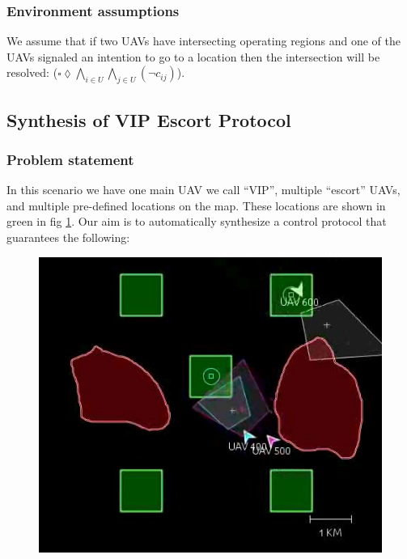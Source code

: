 \documentclass[]{article}
\begin{document}
\subsubsection{Environment assumptions}\label{environment-assumptions}


We assume that if two UAVs have intersecting operating regions and one
of the UAVs signaled an intention to go to a location then the
intersection will be resolved: ($\square  \lozenge \bigwedge\limits_{i \in U}\bigwedge\limits_{j \in U} ( \lnot c_{ij})$).


\subsection{Synthesis of VIP Escort Protocol}\label{vip-escort}

\subsubsection{Problem statement}\label{problem-statement}

In this scenario we have one main UAV we call ``VIP'', multiple
``escort'' UAVs, and multiple pre-defined locations on the map. These locations are shown in green in fig \ref{fig:vip}. Our aim is
to automatically synthesize a control protocol that guarantees the
following:
\begin{figure}[htp]
    \centering
\includegraphics[scale=.4]{figs/vip.png}
    \caption{}
    \label{fig:vip}
\end{figure}
\end{document}
